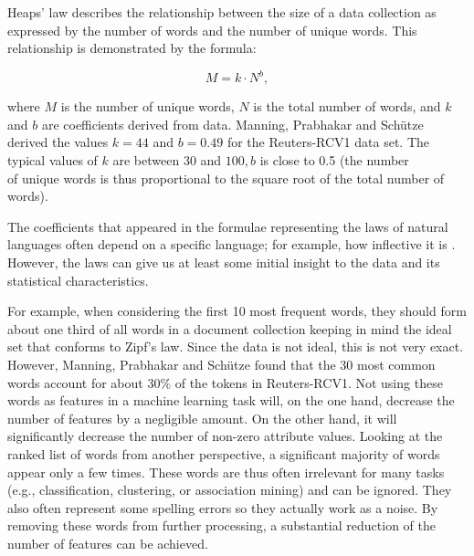\documentclass[11pt,openany,executivepaper]{book}
\begin{document}
Heaps' law \cite{114} describes the relationship between the size of a data collection as expressed by the number of words and the number of unique words. This relationship is demonstrated by the formula:


\begin{equation*}
M=k \cdot N^{b}, \tag{3.3}
\end{equation*}


where $M$ is the number of unique words, $N$ is the total number of words, and $k$ and $b$ are coefficients derived from data. Manning, Prabhakar and Schütze \cite{185} derived the values $k=44$ and $b=0.49$ for the Reuters-RCV1 data set. The typical values of $k$ are between 30 and $100, b$ is close to 0.5 (the number\\
of unique words is thus proportional to the square root of the total number of words).

The coefficients that appeared in the formulae representing the laws of natural languages often depend on a specific language; for example, how inflective it is \cite{98}. However, the laws can give us at least some initial insight to the data and its statistical characteristics.

For example, when considering the first 10 most frequent words, they should form about one third of all words in a document collection keeping in mind the ideal set that conforms to Zipf's law. Since the data is not ideal, this is not very exact. However, Manning, Prabhakar and Schütze \cite{185} found that the 30 most common words account for about $30 \%$ of the tokens in Reuters-RCV1. Not using these words as features in a machine learning task will, on the one hand, decrease the number of features by a negligible amount. On the other hand, it will significantly decrease the number of non-zero attribute values. Looking at the ranked list of words from another perspective, a significant majority of words appear only a few times. These words are thus often irrelevant for many tasks (e.g., classification, clustering, or association mining) and can be ignored. They also often represent some spelling errors so they actually work as a noise. By removing these words from further processing, a substantial reduction of the number of features can be achieved.
\end{document}
